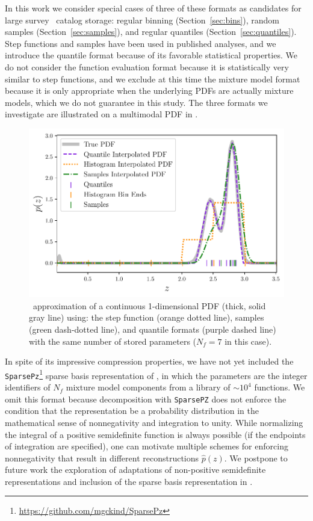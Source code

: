 In this work we consider special cases of three of these formats as candidates 
for large survey \pz\ catalog storage: regular binning 
(Section~\ref{sec:bins}), random samples (Section~\ref{sec:samples}), and 
regular quantiles (Section~\ref{sec:quantiles}).
Step functions and samples have been used in published analyses, and we 
introduce the quantile format because of its favorable statistical properties.
We do not consider the function evaluation format because it is statistically 
very similar to step functions, and we exclude at this time the mixture model 
format because it is only appropriate when the underlying PDFs are actually 
mixture models, which we do not guarantee in this study.
The three formats we investigate are illustrated on a multimodal PDF in 
.
\begin{figure}
	\begin{center}
		\includegraphics[width=\columnwidth]{figures/qp/demo_pz.pdf}
		\caption{\qp\ approximation of a continuous 1-dimensional PDF (thick, solid 
			gray line) using: the step function (orange dotted line), samples (green 
			dash-dotted line), and quantile formats (purple dashed line) with the same 
			number of stored parameters ($N_{f}=7$ in this case).
			}
	\end{center}
\end{figure}

In spite of its impressive compression properties, we have not yet included the 
\texttt{SparsePz}\footnote{\url{https://github.com/mgckind/SparsePz}} sparse 
basis representation of \citet{carrasco_kind_sparse_2014}, in which the 
parameters are the integer identifiers of $N_{f}$ mixture model components from 
a library of $\sim10^{4}$ functions.
We omit this format because decomposition with \texttt{SparsePZ} does not 
enforce the condition that the representation be a probability distribution in 
the mathematical sense of nonnegativity and integration to unity.
While normalizing the integral of a positive semidefinite function is always 
possible (if the endpoints of integration are specified), one can motivate 
multiple schemes for enforcing nonnegativity that result in different 
reconstructions $\hat{p}(z)$.
We postpone to future work the exploration of adaptations of non-positive 
semidefinite representations and inclusion of the sparse basis representation 
in \qp.

